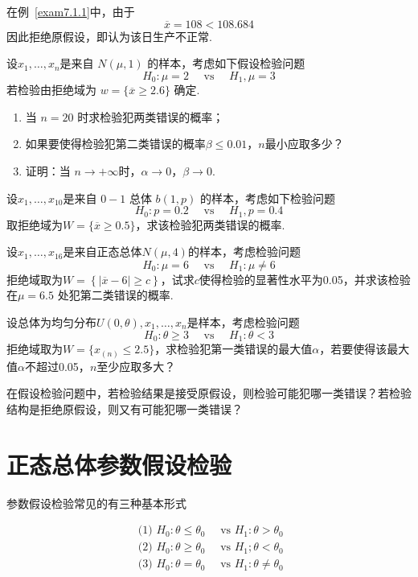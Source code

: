 在例~\ref{exam7.1.1}中，由于
\[\overline { x } = 108 < 108.684\]
因此拒绝原假设，即认为该日生产不正常.
\begin{xiti}
	\item 设$x_1,\dotsc ,x_n$是来自 $N(\mu ,1)$ 的样本，考虑如下假设检验问题
	\[H _ { 0 } : \mu = 2 \quad \text { vs } \quad H _ { 1 } , \mu = 3\]
	若检验由拒绝域为 $w = \{ \overline { x } \geq 2.6 \}$ 确定.
	\begin{enumerate}
		\item 当 $n=20$ 时求检验犯两类错误的概率；
		\item 如果要使得检验犯第二类错误的概率$\beta \leq 0.01$，$n$最小应取多少？
		
		\item 证明：当 $n\rightarrow +\infty $时，$\alpha \rightarrow  0$，$\beta \rightarrow  0$.
	\end{enumerate}
	\item 设$x_1,\dotsc ,x_{10}$是来自 $0-1$ 总体 $b(1,p)$ 的样本，考虑如下检验问题
	\[H _ { 0 } : p = 0.2 \quad \text { vs } \quad H _ { 1 } , p = 0.4\]
	取拒绝域为$W = \{ \overline { x } \geq 0.5 \}$，求该检验犯两类错误的概率.
	
	\item 设$x _ { 1 } , \dotsc , x _ { 16 }$是来自正态总体$N(\mu,4)$的样本，考虑检验问题
	\[H _ { 0 } : \mu = 6 \quad \text { vs } \quad H _ { 1 } : \mu \neq 6\]
	拒绝域取为$W=\left\{\left|\overline{x}-6\right|\geq c\right\}$，试求$c$使得检验的显著性水平为0.05，并求该检验在$\mu =6.5$ 处犯第二类错误的概率.
	
	\item 设总体为均匀分布$U ( 0 , \theta ) , x _ { 1 } , \dotsc , x _ { n }$是样本，考虑检验问题
	\[H _ { 0 } : \theta \geq 3 \quad \text { vs } \quad H _ { 1 } : \theta < 3\]
	拒绝域取为$W = \{ x _ { ( n ) } \leq 2.5 \}$，求检验犯第一类错误的最大值$\alpha$，若要使得该最大值$\alpha$不超过0.05，$n$至少应取多大？
	
	\item 在假设检验问题中，若检验结果是接受原假设，则检验可能犯哪一类错误？若检验结构是拒绝原假设，则又有可能犯哪一类错误？
		
\end{xiti}


\section{正态总体参数假设检验\label{sec:7.2}}
参数假设检验常见的有三种基本形式

\[\begin{array} { l } { \text { (1) } H _ { 0 } : \theta \leq \theta _ { 0 } \quad \text { vs } H _ { 1 } : \theta > \theta _ { 0 } } \\ { \text { (2) } H _ { 0 } : \theta \geq \theta _ { 0 } \quad \text { vs } H _ { 1 } ; \theta < \theta _ { 0 } } \\ { \text { (3) } H _ { 0 } : \theta = \theta _ { 0 } \quad \text { vs } H _ { 1 } : \theta \neq \theta _ { 0 } } \end{array}\]

